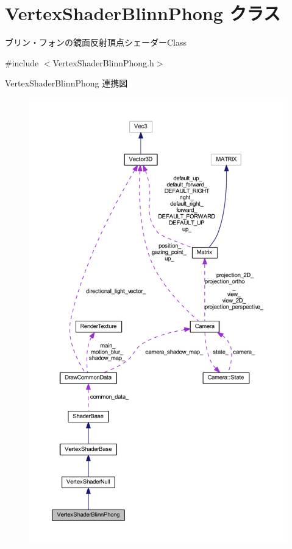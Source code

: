 \hypertarget{class_vertex_shader_blinn_phong}{}\section{Vertex\+Shader\+Blinn\+Phong クラス}
\label{class_vertex_shader_blinn_phong}


ブリン・フォンの鏡面反射頂点シェーダー\+Class  




{\ttfamily \#include $<$Vertex\+Shader\+Blinn\+Phong.\+h$>$}



Vertex\+Shader\+Blinn\+Phong 連携図\nopagebreak
\begin{figure}[H]
\begin{center}
\leavevmode
\includegraphics[height=550pt]{class_vertex_shader_blinn_phong__coll__graph}
\end{center}
\end{figure}
